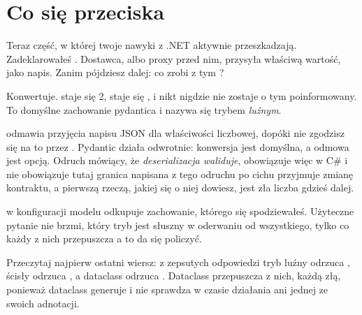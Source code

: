 \section{Co się przeciska}
\label{sec:ai-what-gets-through}

Teraz część, w której twoje nawyki z .NET aktywnie przeszkadzają.
Zadeklarowałeś . Dostawca, albo proxy przed nim, przysyła
 \dash{} właściwą wartość, jako napis. Zanim pójdziesz dalej: co
zrobi z tym ?



Konwertuje.  staje się \num{2},  staje się
, i nikt nigdzie nie zostaje o tym poinformowany. To domyślne
zachowanie pydantica i nazywa się trybem \emph{luźnym}.

\begin{trapbox}
 odmawia przyjęcia napisu JSON dla właściwości
liczbowej, dopóki nie zgodzisz się na to przez .
Pydantic działa odwrotnie: konwersja jest domyślna, a odmowa jest opcją.
Odruch mówiący, że \emph{deserializacja waliduje}, obowiązuje więc w C\# i
nie obowiązuje tutaj \dash{} granica napisana z tego odruchu po cichu
przyjmuje zmianę kontraktu, a pierwszą rzeczą, jakiej się o niej dowiesz,
jest zła liczba gdzieś dalej.

\end{trapbox}

 w konfiguracji modelu odkupuje zachowanie, którego się
spodziewałeś. Użyteczne pytanie nie brzmi, który tryb jest słuszny w
oderwaniu od wszystkiego, tylko co każdy z nich przepuszcza \dash{} a to da
się policzyć.




Przeczytaj najpierw ostatni wiersz: z  zepsutych odpowiedzi
tryb luźny odrzuca , ścisły odrzuca
, a dataclass odrzuca .
Dataclass przepuszcza  z nich, każdą złą, ponieważ
dataclass generuje  i nie sprawdza w czasie działania ani
jednej ze swoich adnotacji.

